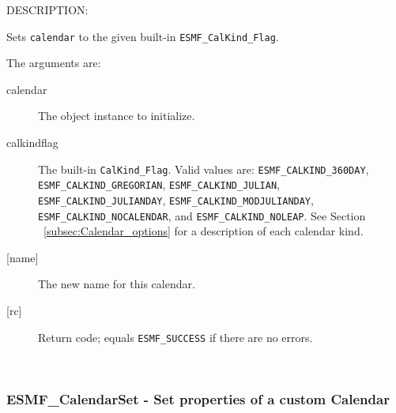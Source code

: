 {\sf DESCRIPTION:\\ }


       Sets {\tt calendar} to the given built-in {\tt ESMF\_CalKind\_Flag}. 
  
       The arguments are:
       \begin{description}
       \item[calendar]
            The object instance to initialize.
       \item[calkindflag]
            The built-in {\tt CalKind\_Flag}.  Valid values are:
              \newline
              {\tt ESMF\_CALKIND\_360DAY}, 
              \newline
              {\tt ESMF\_CALKIND\_GREGORIAN},
              \newline
              {\tt ESMF\_CALKIND\_JULIAN}, 
              \newline
              {\tt ESMF\_CALKIND\_JULIANDAY},
              \newline
              {\tt ESMF\_CALKIND\_MODJULIANDAY}, 
              \newline
              {\tt ESMF\_CALKIND\_NOCALENDAR},
              \newline
              and {\tt ESMF\_CALKIND\_NOLEAP}.
              \newline
            See Section ~\ref{subsec:Calendar_options} for a description of each
            calendar kind.
       \item[{[name]}]
            The new name for this calendar.
       \item[{[rc]}]
            Return code; equals {\tt ESMF\_SUCCESS} if there are no errors.
       \end{description}
       
 
\mbox{}\hrulefill\ 
 
\subsubsection [ESMF\_CalendarSet] {ESMF\_CalendarSet - Set properties of a custom Calendar}


